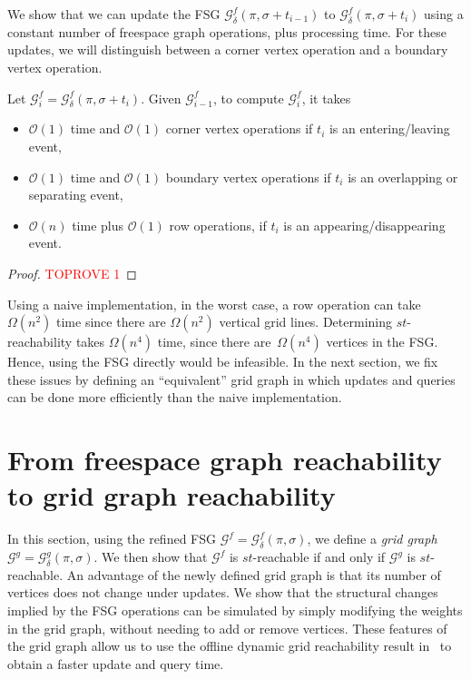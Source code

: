 \documentclass[thm-restate]{lipics-v2021}
\theoremstyle{remark}
\newcommand{\Oh}{\mathcal{O}}
\newcommand{\graph}[0]{\mathcal{G}}
\newcommand{\doublequote}[1]{``#1''}
\newcommand{\fsgraph}[0]{\graph^{f}}
\newcommand{\ggraph}[0]{\graph^g}
\begin{document}
We show that we can update the FSG $\fsgraph_\delta(\pi, \sigma + t_{i - 1})$ to $\fsgraph_\delta(\pi, \sigma + t_{i})$ using a constant number of freespace graph operations, plus processing time. For these updates, we will distinguish between a corner vertex operation and a boundary vertex operation.  

\begin{lemma} \label{lem:fsgraph-event-updates}
    Let $\fsgraph_i = \fsgraph_\delta(\pi, \sigma + t_i)$. Given $\fsgraph_{i - 1}$, to compute $\fsgraph_i$, it takes 
    \begin{itemize}
        \item $\Oh(1)$ time and $\Oh(1)$ corner vertex operations if $t_{i}$ is an entering/leaving event, 
        \item $\Oh(1)$ time and $\Oh(1)$ boundary vertex operations if $t_i$ is an overlapping or separating event, 
        \item $\Oh(n)$ time plus $\Oh(1)$ row operations, if $t_i$ is an appearing/disappearing event. 
    \end{itemize}
\end{lemma}

\begin{proof}\textcolor{red}{TOPROVE 1}\end{proof}

Using a naive implementation, in the worst case, a row operation can take $\Omega(n^2)$ time since there are $\Omega(n^2)$ vertical grid lines. Determining $st$-reachability takes $\Omega(n^4)$ time, since there are~$\Omega(n^4)$ vertices in the FSG.
Hence, using the FSG directly would be infeasible.
In the next section, we fix these issues by defining an \doublequote{equivalent} grid graph in which updates and queries can be done more efficiently than the naive implementation. 

\section{From freespace graph reachability to grid graph reachability} \label{sec:fsg-to-gg}
In this section, using the refined FSG $\fsgraph = \fsgraph_\delta(\pi, \sigma)$, we define a \emph{grid graph} $\ggraph = \ggraph_\delta(\pi, \sigma)$. We then show that $\fsgraph$ is $st$-reachable if and only if $\ggraph$ is $st$-reachable. An advantage of the newly defined grid graph is that its number of vertices does not change under updates. We show that the structural changes implied by the FSG operations can be simulated by simply modifying the weights in the grid graph, without needing to add or remove vertices. These features of the grid graph allow us to use the offline dynamic grid reachability result in~\cite{bringmannFrechetDistanceTranslation2021} to obtain a faster update and query time.
\end{document}
